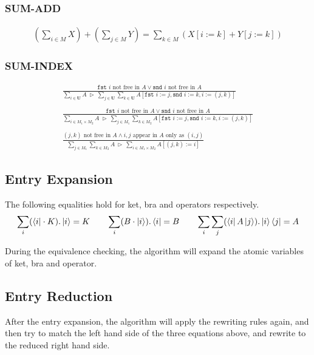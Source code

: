 \documentclass[manuscript, review, timestamp]{acmart}
\newcommand*{\fst}{\texttt{fst }}
\newcommand*{\snd}{\texttt{snd }}
\newcommand*{\reduce}{\ \triangleright\ }
\begin{document}
\subsubsection*{SUM-ADD}
\begin{gather*}
  (\sum_{i \in M} X) + (\sum_{j \in M} Y) = \sum_{k \in M} (X[i:=k] + Y[j:=k])
\end{gather*}

\subsubsection*{SUM-INDEX}
\begin{gather*}
  \frac{\fst i \text{ not free in } A \vee \snd i \text{ not free in } A}{\sum_{i\in\mathbf{U}}A \reduce \sum_{j\in\mathbf{U}}\sum_{k\in\mathbf{U}}A[\fst i:=j, \snd i:=k, i:=(j,k)]}
  \\
  \\
  \frac{\fst i \text{ not free in } A \vee \snd i \text{ not free in } A}{\sum_{i\in M_1 \times M_2}A \reduce \sum_{j\in M_1}\sum_{k\in M_2}A[\fst i:=j, \snd i:=k, i:=(j,k)]}
  \\
  \\
  \frac{(j, k) \text{ not free in } A \wedge i, j \text{ appear in } A \text{ only as } (i, j)}{\sum_{j\in M_1}\sum_{k\in M_2}A \reduce \sum_{i\in M_1\times M_2}A[(j,k):=i]}
\end{gather*}

\subsection{Entry Expansion}

The following equalities hold for ket, bra and operators respectively. 
\begin{gather*}
  \sum_i (\bra{i} \cdot K).\ket{i} = K
  \qquad
  \sum_i (B \cdot \ket{i}).\bra{i} = B
  \qquad
  \sum_i \sum_j (\bra{i} A \ket{j}).\ket{i}\bra{j} = A
\end{gather*}

During the equivalence checking, the algorithm will expand the atomic variables of ket, bra and operator.

\subsection{Entry Reduction}

After the entry expansion, the algorithm will apply the rewriting rules again, and then try to match the left hand side of the three equations above, and rewrite to the reduced right hand side.
\end{document}
